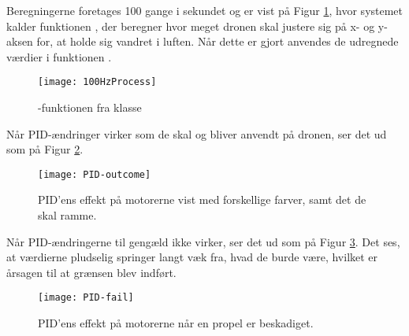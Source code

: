 \documentclass[Main]{subfiles}
\begin{document}
Beregningerne foretages 100 gange i sekundet og er vist på Figur \ref{Fig:100HzProcess}, hvor systemet kalder funktionen , der beregner hvor meget dronen skal justere sig på x- og y-aksen for, at holde sig vandret i luften.
Når dette er gjort anvendes de udregnede værdier i funktionen .

\begin{figure}[H]
\centering
\texttt{[image: 100HzProcess]}
\caption{-funktionen fra klasse }
\label{Fig:100HzProcess}
\end{figure}

Når PID-ændringer virker som de skal og bliver anvendt på dronen, ser det ud som på Figur \ref{Fig:PID-outcome}.

\begin{figure}[htbp]
\centering
\texttt{[image: PID-outcome]}
\caption{PID'ens effekt på motorerne vist med forskellige farver, samt det de skal ramme.}
\label{Fig:PID-outcome}
\end{figure}

Når PID-ændringerne til gengæld ikke virker, ser det ud som på Figur \ref{Fig:PID-fail}.
Det ses, at værdierne pludselig springer langt væk fra, hvad de burde være, hvilket er årsagen til at grænsen blev indført.

\begin{figure}[htbp]
\centering
\texttt{[image: PID-fail]}
\caption{PID'ens effekt på motorerne når en propel er beskadiget.}
\label{Fig:PID-fail}
\end{figure}
\end{document}

